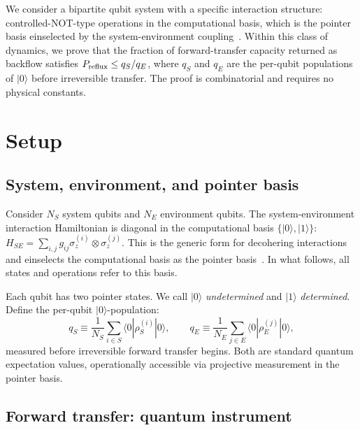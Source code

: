 \documentclass[aps,prl,twocolumn,superscriptaddress,hyperref]{revtex4-2}
\begin{document}
We consider a bipartite qubit system with a specific interaction structure: controlled-NOT-type operations in the computational basis, which is the pointer basis einselected by the system-environment coupling~\cite{Zurek:2003}. Within this class of dynamics, we prove that the fraction of forward-transfer capacity returned as backflow satisfies $P_{\rm reflux} \leq q_S/q_E$, where $q_S$ and $q_E$ are the per-qubit populations of $|0\rangle$ before irreversible transfer. The proof is combinatorial and requires no physical constants.

\section{Setup}

\subsection{System, environment, and pointer basis}

Consider $N_S$ system qubits and $N_E$ environment qubits. The system-environment interaction Hamiltonian is diagonal in the computational basis $\{|0\rangle,|1\rangle\}$: $H_{SE} = \sum_{i,j} g_{ij} \sigma_z^{(i)} \otimes \sigma_z^{(j)}$. This is the generic form for decohering interactions and einselects the computational basis as the pointer basis~\cite{Zurek:2003}. In what follows, all states and operations refer to this basis.

Each qubit has two pointer states. We call $|0\rangle$ \emph{undetermined} and $|1\rangle$ \emph{determined}. Define the per-qubit $|0\rangle$-population:
\begin{equation}
q_S \equiv \frac{1}{N_S}\sum_{i\in S} \langle 0|\rho_S^{(i)}|0\rangle, \qquad
q_E \equiv \frac{1}{N_E}\sum_{j\in E} \langle 0|\rho_E^{(j)}|0\rangle,
\label{eq:qdef}
\end{equation}
measured before irreversible forward transfer begins. Both are standard quantum expectation values, operationally accessible via projective measurement in the pointer basis.

\subsection{Forward transfer: quantum instrument}
\end{document}
